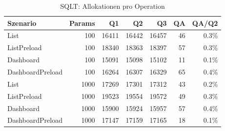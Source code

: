 \begin{table}[ht]
\caption{SQLT: Allokationen pro Operation}
\begin{tabular}{lrrrrrr}
\toprule
Szenario & Params & Q1 & Q2 & Q3 & QA & QA/Q2 \\
\midrule
	List & 100 & 16411 & 16442 & 16457 & 46 & 0.3\% \\
	ListPreload & 100 & 18340 & 18363 & 18397 & 57 & 0.3\% \\
	Dashboard & 100 & 15091 & 15098 & 15102 & 11 & 0.1\% \\
	DashboardPreload & 100 & 16264 & 16307 & 16329 & 65 & 0.4\% \\
	List & 1000 & 17269 & 17301 & 17312 & 43 & 0.2\% \\
	ListPreload & 1000 & 19523 & 19554 & 19572 & 49 & 0.3\% \\
	Dashboard & 1000 & 15900 & 15924 & 15957 & 57 & 0.4\% \\
	DashboardPreload & 1000 & 17147 & 17159 & 17165 & 18 & 0.1\% \\
\bottomrule
\end{tabular}
\label{tab:benchmark_sqlt_allocsperop}
\end{table}
	